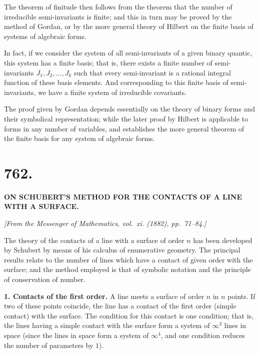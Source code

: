 \documentclass[11pt,a4paper]{book}
\begin{document}
The theorem of finitude then follows from the theorem that the number of
irreducible semi-invariants is finite; and this in turn may be proved by the
method of Gordan, or by the more general theory of Hilbert on the finite
basis of systems of algebraic forms.

In fact, if we consider the system of all semi-invariants of a given binary
quantic, this system has a finite basis; that is, there exists a finite number
of semi-invariants $J_1, J_2, \ldots, J_k$ such that every semi-invariant is a rational
integral function of these basis elements. And corresponding to this finite
basis of semi-invariants, we have a finite system of irreducible covariants.

The proof given by Gordan depends essentially on the theory of binary
forms and their symbolical representation; while the later proof by Hilbert
is applicable to forms in any number of variables, and establishes the more
general theorem of the finite basis for any system of algebraic forms.

\newpage


\section*{762.}

\begin{center}
\textbf{ON SCHUBERT'S METHOD FOR THE CONTACTS OF A LINE WITH A SURFACE.}
\end{center}

\begin{flushright}
\textit{[From the Messenger of Mathematics, vol.~xi. (1882), pp.~71--84.]}
\end{flushright}

The theory of the contacts of a line with a surface of order $n$ has been
developed by Schubert by means of his calculus of enumerative geometry.
The principal results relate to the number of lines which have a contact
of given order with the surface; and the method employed is that of
symbolic notation and the principle of conservation of number.

\textbf{1. Contacts of the first order.} A line meets a surface of order $n$ in $n$
points. If two of these points coincide, the line has a contact of the first
order (simple contact) with the surface. The condition for this contact is
one condition; that is, the lines having a simple contact with the surface
form a system of $\infty^3$ lines in space (since the lines in space form a system
of $\infty^4$, and one condition reduces the number of parameters by $1$).
\end{document}
